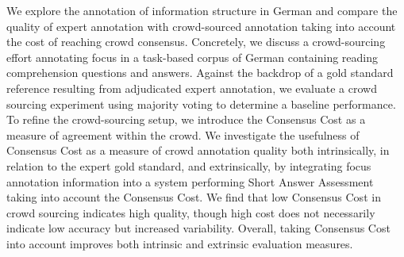 We explore the annotation of information structure in German and compare the quality of expert annotation with crowd-sourced annotation taking into account the cost of reaching crowd consensus. Concretely, we discuss a crowd-sourcing effort annotating focus in a task-based corpus of German containing reading comprehension questions and answers. Against the backdrop of a gold standard reference resulting from adjudicated expert annotation, we evaluate a crowd sourcing experiment using majority voting to determine a baseline performance. To refine the crowd-sourcing setup, we introduce the Consensus Cost as a measure of agreement within the crowd. We investigate the usefulness of Consensus Cost as a measure of crowd annotation quality both intrinsically, in relation to the expert gold standard, and extrinsically, by integrating focus annotation information into a system performing Short Answer Assessment taking into account the Consensus Cost. We find that low Consensus Cost in crowd sourcing indicates high quality, though high cost does not necessarily indicate low accuracy but increased variability. Overall, taking Consensus Cost into account improves both intrinsic and extrinsic evaluation measures.
